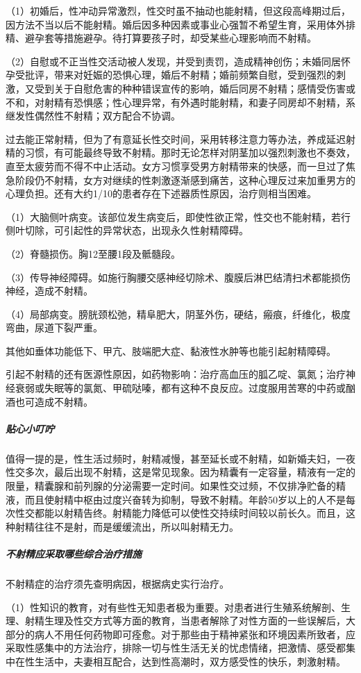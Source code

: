 （1）初婚后，性冲动异常激烈，性交时虽不抽动也能射精，但这段高峰期过后，因方法不当以后不能射精。婚后因多种因素或事业心强暂不希望生育，采用体外排精、避孕套等措施避孕。待打算要孩子时，却受某些心理影响而不射精。

（2）自慰或不正当性交活动被人发现，并受到责罚，造成精神创伤；未婚同居怀孕受批评，带来对妊娠的恐惧心理，婚后不射精；婚前频繁自慰，受到强烈的刺激，又受到关于自慰危害的种种错误宣传的影响，婚后同房不射精；感情受伤害或不和，对射精有恐惧感；性心理异常，有外遇时能射精，和妻子同房却不射精，系继发性偶然性不射精；双方配合不协调。

过去能正常射精，但为了有意延长性交时间，采用转移注意力等办法，养成延迟射精的习惯，有可能最终导致不射精。那时无论怎样对阴茎加以强烈刺激也不奏效，直至太疲劳而不得不中止活动。女方习惯享受男方射精带来的快感，而一旦过了焦急阶段仍不射精，女方对继续的性刺激逐渐感到痛苦，这种心理反过来加重男方的心理负担。还有大约1/10的患者存在下述器质性原因，治疗则相当困难。

（1）大脑侧叶病变。该部位发生病变后，即使性欲正常，性交也不能射精，若行侧叶切除，可引起性的异常状态，出现永久性射精障碍。

（2）脊髓损伤。胸12至腰1段及骶髓段。

（3）传导神经障碍。如施行胸腰交感神经切除术、腹膜后淋巴结清扫术都能损伤神经，造成不射精。

（4）局部病变。膀胱颈松弛，精阜肥大，阴茎外伤，硬结，瘢痕，纤维化，极度弯曲，尿道下裂严重。

其他如垂体功能低下、甲亢、肢端肥大症、黏液性水肿等也能引起射精障碍。

引起不射精的还有医源性原因，如药物影响：治疗高血压的胍乙啶、氯氮；治疗神经衰弱或失眠等的氯氮、甲硫哒嗪，都有这种不良反应。过度服用苦寒的中药或酗酒也可造成不射精。

\subparagraph{贴心小叮咛}

值得一提的是，性生活过频时，射精减慢，甚至延长或不射精，如新婚夫妇，一夜性交多次，最后出现不射精，这是常见现象。因为精囊有一定容量，精液有一定的限量，精囊腺和前列腺的分泌需要一定时间。如果性交过频，不仅排净贮备的精液，而且使射精中枢由过度兴奋转为抑制，导致不射精。年龄50岁以上的人不是每次性交都能以射精告终。射精能力降低可以使性交持续时间较以前长久。而且，这种射精往往不是射，而是缓缓流出，所以叫射精无力。

\subparagraph{不射精应采取哪些综合治疗措施}

不射精症的治疗须先查明病因，根据病史实行治疗。

（1）性知识的教育，对有些性无知患者极为重要。对患者进行生殖系统解剖、生理、射精生理及性交方式等方面的教育，当患者解除了对性方面的一些误解后，大部分的病人不用任何药物即可痊愈。对于那些由于精神紧张和环境因素所致者，应采取性感集中的方法治疗，排除一切与性生活无关的忧虑情绪，把激情、感受都集中在性生活中，夫妻相互配合，达到性高潮时，双方感受性的快乐，刺激射精。


